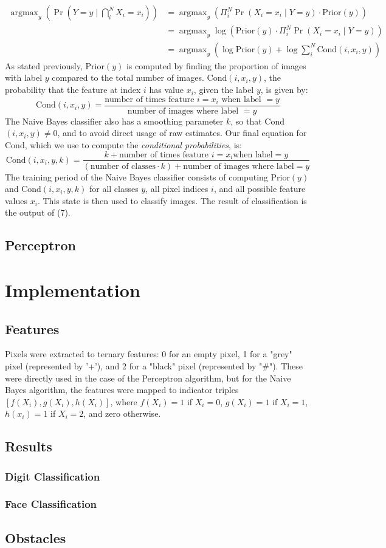 \documentclass{article}
\DeclareMathOperator*{\argmax}{argmax}
\begin{document}
  \begin{align}
  \argmax_y (\Pr(Y = y \mid \bigcap_i^NX_i = x_i)) &= \argmax_y( \Pi_i^N\Pr(X_i = x_i \mid Y = y) \cdot \text{Prior}(y)) \\
  &= \argmax_y \log (\text{Prior}(y) \cdot \Pi_i^N\Pr(X_i = x_i \mid Y = y)) \\
  &= \argmax_y (\log \text{Prior}(y) + \log \sum_i^N\text{Cond}(i, x_i, y))
  \end{align}
  As stated previously, Prior$(y)$ is computed by finding the proportion of images with label $y$ compared to the total number of images.
  Cond$(i, x_i, y)$, the probability that the feature at index $i$ has value $x_i$, given the label $y$, is given by:
  \begin{equation}
  \text{Cond}(i, x_i, y) = \frac{\text{number of times feature $i = x_i$ when label $= y$}}{\text{number of images where label $= y$}}
  \end{equation}
  The Naive Bayes classifier also has a smoothing parameter $k$, so that Cond$(i, x_i, y) \ne 0$, and to avoid direct usage of raw estimates.
  Our final equation for Cond, which we use to compute the {\em conditional probabilities}, is:
  \begin{equation}
  \text{Cond}(i, x_i, y, k) = \frac{k + \text{number of times feature }i = x_i \text{when label}= y}{(\text{number of classes}\cdot k) + \text{number of images where label}= y}
  \end{equation}
  The training period of the Naive Bayes classifier consists of computing Prior$(y)$ and Cond$(i, x_i, y, k)$ for all classes $y$, all pixel indices $i$, and all possible feature values $x_i$.
  This state is then used to classify images. The result of classification is the output of (7).
  \subsection{Perceptron}
  \section{Implementation}
  \subsection{Features}
  Pixels were extracted to ternary features: 0 for an empty pixel, 1 for a "grey" pixel (represented by '+'), and 2 for a "black" pixel (represented by "\#").
  These were directly used in the case of the Perceptron algorithm, but for the Naive Bayes algorithm, the features were mapped to indicator triples $[f(X_i), g(X_i), h(X_i)]$,
  where $f(X_i) = 1$ if $X_i = 0$, $g(X_i) = 1$ if $X_i = 1$, $h(x_i) = 1$ if $X_i = 2$, and zero otherwise.
  \subsection{Results}
  \subsubsection{Digit Classification}
  \subsubsection{Face Classification}
  \subsection{Obstacles}
\end{document}
